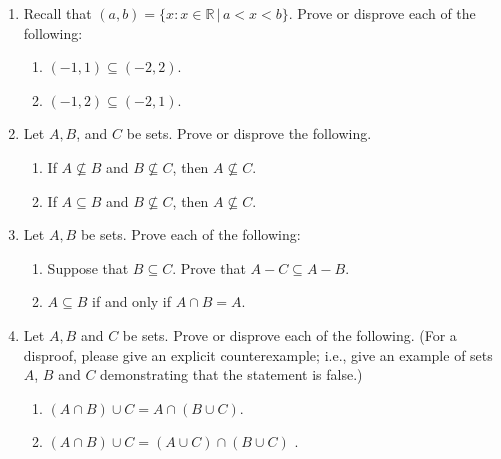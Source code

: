 \documentclass[12pt]{article}
\begin{document}
\begin{enumerate}
\item Recall that $(a,b) = \{x : x \in \mathbb{R} \,|\, a < x < b\}$. Prove or disprove each of the following:
 \begin{enumerate}
 \item $(-1,1) \subseteq (-2,2)$. 
 \item $(-1,2) \subseteq (-2,1)$.
 \end{enumerate}

 \item Let $A,B$, and $C$ be sets. Prove or disprove the following.
 \begin{enumerate}
 \item If $A \not \subseteq B$ and $B \not \subseteq C$, then $A \not \subseteq C$.
 \item If $A \subseteq B$ and $B \not \subseteq C$, then $A \not \subseteq C$.
 \end{enumerate}


 \item Let $A,B$ be sets. Prove each of the following:
 \begin{enumerate}
 \item Suppose that $B \subseteq C$. Prove that $A-C \subseteq A-B$.
 \item $A \subseteq B$ if and only if $A \cap B = A$.
 \end{enumerate}
 
  \item Let $A,B$ and $C$ be sets. Prove or disprove each of the following. (For a disproof, please give an explicit counterexample; i.e., give an example of sets $A$, $B$ and $C$ demonstrating that the statement is false.)
 \begin{enumerate}
\item $(A \cap B ) \cup C = A \cap (B  \cup C)$.
\item $(A \cap B ) \cup C = (A \cup C) \cap (B  \cup C)$  .
 \end{enumerate}


\end{enumerate}
\end{document}
